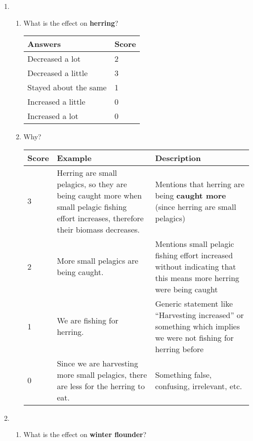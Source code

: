 \begin{enumerate}

\item 
\begin{enumerate}
\item What is the effect on \textbf{herring}? 

\begin{tabular}{| l | l |} \hline
\rowcolor{cyan!35} \textbf{Answers} & \textbf{Score} \\ \hline
Decreased a lot & 2 \\ 
Decreased a little & 3 \\ 
Stayed about the same & 1 \\ 
Increased a little & 0 \\
Increased a lot & 0 \\
\hline
\end{tabular}

\item Why?

\begin{tabular}{| l | p{5.25cm} | p{5.7cm} |} \hline
\rowcolor{cyan!35} \textbf{Score} & \textbf{Example} & \textbf{Description} \\ \hline
3 & Herring are small pelagics, so they are being caught more when small pelagic fishing effort increases, therefore their biomass decreases. & Mentions that herring are being \textbf{caught more} (since herring are small pelagics) \\ 
2 & More small pelagics are being caught. & Mentions small pelagic fishing effort increased without indicating that this means more herring were being caught \\ 
1 & We are fishing for herring. & Generic statement like ``Harvesting increased'' or something which implies we were not fishing for herring before \\ 
0 & Since we are harvesting more small pelagics, there are less for the herring to eat. & Something false, confusing, irrelevant, etc. \\
\hline
\end{tabular}

\end{enumerate}

\item 
\begin{enumerate}
\item What is the effect on \textbf{winter flounder}?


\end{enumerate}
\end{enumerate}
